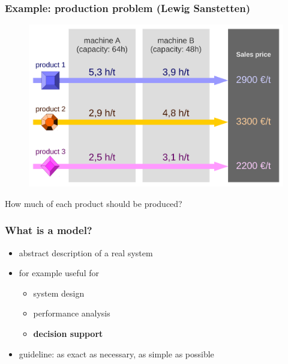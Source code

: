 
\begin{frame}
 \frametitle{Example: production problem (Lewig Sanstetten)}
 \begin{figure}
  \centering
  \includegraphics[width=\linewidth]{Bilder/LewigSanstetten}
 \end{figure}
 
 How much of each product should be produced?
\end{frame}

\begin{frame}
 \frametitle{What is a model?}
 \begin{itemize}
  \item abstract description of a real system
  \item for example useful for
  \begin{itemize}
   \item system design
   \item performance analysis
   \item \textbf{decision support}
  \end{itemize}
  \item guideline: as exact as necessary, as simple as possible
 \end{itemize}
\end{frame}

